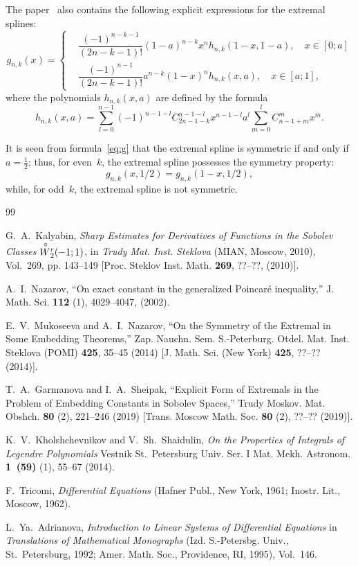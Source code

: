 \documentclass[12pt,oneside]{amsproc}
\numberwithin{equation}{section}
\newcommand{\Wo}{{\raisebox{0.2ex}{$\stackrel{\circ}{W}$}}{}}
\begin{document}
 The paper~\cite{GarmSh}
also contains the following explicit expressions for the extremal splines:
\begin{equation}
\label{eq:g}
g_{n,k}(x)=\left\{\begin{aligned}
&\dfrac{(-1)^{n-k-1}}{(2n-k-1)!}(1-a)^{n-k}x^n h_{n,k}(1-x,1-a),\quad x\in [0;a]\\
&\dfrac{(-1)^{n-1}}{(2n-k-1)!}a^{n-k}(1-x)^{n} h_{n,k}(x,a), \quad x\in [a;1],
\end{aligned}\right.
\end{equation}
where the polynomials
$h_{n,k}(x,a)$
are defined by the formula
$$
h_{n,k}(x,a)=\sum_{l=0}^{n-1}(-1)^{n-1-l}C_{2n-1-k}^{n-1-l}x^{n-1-l}a^l\sum_{m=0}^{l}C_{n-
1+m}^{m}x^{m}.
$$

 It is seen from formula~\eqref{eq:g} that
the extremal spline is symmetric
if and only if
$a=\frac12$;
thus, for even~$k$,
the extremal spline possesses the symmetry property:
$$
g_{n,k}(x,1/2)=g_{n,k}(1-x,1/2),
$$
while, for odd~$k$,
the extremal spline is not symmetric.


\begin{thebibliography}{99}

 G.~A.~Kalyabin,
\textit{Sharp Estimates for Derivatives of Functions
in the Sobolev Classes $\Wo^{r}_2(-1;1)$},
in \textit{Trudy Mat. Inst. Steklova}
(MIAN, Moscow, 2010), Vol.~269, pp. 143--149
[Proc. Steklov Inst. Math. \textbf{269}, ??--??, (2010)].

 A.~I.~Nazarov,
``On exact constant in the generalized Poincar\'{e} inequality,''
J. Math. Sci. \textbf{112} (1), 4029--4047, (2002).

 E.~V.~Mukoseeva and A.~I.~Nazarov,
``On the Symmetry of the Extremal in Some Embedding Theorems,''
 Zap. Nauchn. Sem. S.-Peterburg. Otdel. Mat. Inst. Steklova (POMI)
\textbf{425}, 35--45 (2014)
[J. Math. Sci. (New York) \textbf{425}, ??--?? (2014)].

 T.~A.~Garmanova and I.~A.~Sheipak,
``Explicit Form of Extremals in the Problem of Embedding Constants in Sobolev Spaces,''
Trudy Moskov. Mat. Obshch. \textbf{80} (2), 221--246 (2019)
[Trans. Moscow Math. Soc. \textbf{80} (2), ??--?? (2019)].

 K.~V.~Kholshchevnikov and V.~Sh.~Shaidulin,
\textit{On the Properties of Integrals of Legendre Polynomials}
 Vestnik St.~Petersburg Univ. Ser. I Mat. Mekh. Astronom.
\textbf{1\, (59)} (1), 55--67 (2014).

 F.~Tricomi,
\textit{Differential Equations}
(Hafner Publ., New York, 1961;
Inostr. Lit., Moscow, 1962).

 L.~Ya.~Adrianova,
\textit{Introduction to Linear Systems of Differential Equations}
in \textit{Translations of Mathematical Monographs}
(Izd. S.-Petersbg. Univ., St.~Petersburg, 1992;
Amer. Math. Soc., Providence, RI, 1995),
Vol.~146.

\end{thebibliography}
\end{document}
